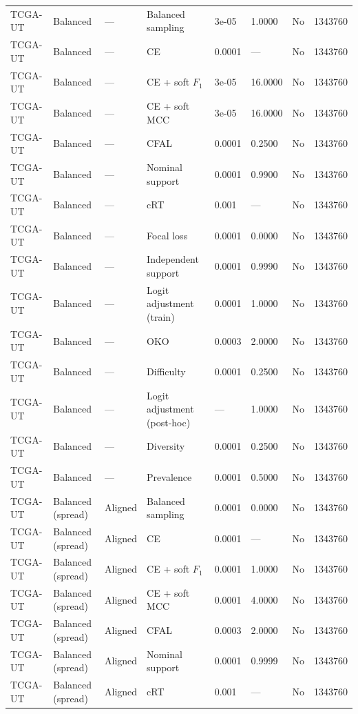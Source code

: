 \begin{longtable}{lllllllr}
TCGA-UT & Balanced & --- & Balanced sampling & 3e-05 & 1.0000 & No & 1343760 \\
TCGA-UT & Balanced & --- & CE & 0.0001 & --- & No & 1343760 \\
TCGA-UT & Balanced & --- & CE + soft $F_1$ & 3e-05 & 16.0000 & No & 1343760 \\
TCGA-UT & Balanced & --- & CE + soft MCC & 3e-05 & 16.0000 & No & 1343760 \\
TCGA-UT & Balanced & --- & CFAL & 0.0001 & 0.2500 & No & 1343760 \\
TCGA-UT & Balanced & --- & Nominal support & 0.0001 & 0.9900 & No & 1343760 \\
TCGA-UT & Balanced & --- & cRT & 0.001 & --- & No & 1343760 \\
TCGA-UT & Balanced & --- & Focal loss & 0.0001 & 0.0000 & No & 1343760 \\
TCGA-UT & Balanced & --- & Independent support & 0.0001 & 0.9990 & No & 1343760 \\
TCGA-UT & Balanced & --- & Logit adjustment (train) & 0.0001 & 1.0000 & No & 1343760 \\
TCGA-UT & Balanced & --- & OKO & 0.0003 & 2.0000 & No & 1343760 \\
TCGA-UT & Balanced & --- & Difficulty & 0.0001 & 0.2500 & No & 1343760 \\
TCGA-UT & Balanced & --- & Logit adjustment (post-hoc) & --- & 1.0000 & No & 1343760 \\
TCGA-UT & Balanced & --- & Diversity & 0.0001 & 0.2500 & No & 1343760 \\
TCGA-UT & Balanced & --- & Prevalence & 0.0001 & 0.5000 & No & 1343760 \\
TCGA-UT & Balanced (spread) & Aligned & Balanced sampling & 0.0001 & 0.0000 & No & 1343760 \\
TCGA-UT & Balanced (spread) & Aligned & CE & 0.0001 & --- & No & 1343760 \\
TCGA-UT & Balanced (spread) & Aligned & CE + soft $F_1$ & 0.0001 & 1.0000 & No & 1343760 \\
TCGA-UT & Balanced (spread) & Aligned & CE + soft MCC & 0.0001 & 4.0000 & No & 1343760 \\
TCGA-UT & Balanced (spread) & Aligned & CFAL & 0.0003 & 2.0000 & No & 1343760 \\
TCGA-UT & Balanced (spread) & Aligned & Nominal support & 0.0001 & 0.9999 & No & 1343760 \\
TCGA-UT & Balanced (spread) & Aligned & cRT & 0.001 & --- & No & 1343760 \\

\end{longtable}

